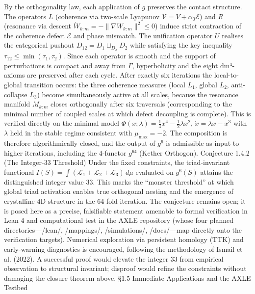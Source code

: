 By the orthogonality law, each application of $  g  $ preserves the contact structure. The operators $  L  $ (coherence via two-scale Lyapunov $  \mathcal{V} = V + \alpha_0 \mathcal{E}  $) and $  R  $ (resonance via descent $  \dot{W}_{k:m} = -\|\nabla W_{k:m}\|^2 \le 0  $) induce strict contraction of the coherence defect $  \mathcal{E}  $ and phase mismatch. The unification operator $  U  $ realises the categorical pushout $  D_{12} = D_1 \sqcup_{D_\lambda} D_2  $ while satisfying the key inequality $  \tau_{12} \le \min(\tau_1, \tau_2)  $. Since each operator is smooth and the support of perturbations is compact and away from $  \Gamma  $, hyperbolicity and the eight dm³-axioms are preserved after each cycle. After exactly six iterations the local-to-global transition occurs: the three coherence measures (local $  L_1  $, global $  L_2  $, anti-collapse $  L_3  $) become simultaneously active at all scales, because the resonance manifold $  M_{k:m}  $ closes orthogonally after six traversals (corresponding to the minimal number of coupled scales at which defect decoupling is complete). This is verified directly on the minimal model $  \Phi(x;\lambda) = \frac14 x^4 - \frac12 \lambda x^2  $, $  \dot{x} = \lambda x - x^3  $ with $  \lambda  $ held in the stable regime consistent with $  \mu_{\max} = -2  $. The composition is therefore algorithmically closed, and the output of $  g^6  $ is admissible as input to higher iterations, including the 4-functor $  g^{64}  $ (Kether Orthogon).
Conjecture 1.4.2 (The Integer-33 Threshold)
Under the fixed constraints, the triad-invariant functional
$   I(S) = \int (\mathcal{L}_1 + \mathcal{L}_2 + \mathcal{L}_3) \, d\mu   $
evaluated on $  g^6(S)  $ attains the distinguished integer value 33. This marks the “monster threshold” at which global triad activation enables true orthogonal nesting and the emergence of crystalline 4D structure in the 64-fold iteration.
The conjecture remains open; it is posed here as a precise, falsifiable statement amenable to formal verification in Lean 4 and computational test in the AXLE repository (whose four planned directories—/lean/, /mappings/, /simulations/, /docs/—map directly onto the verification targets). Numerical exploration via persistent homology (TTK) and early-warning diagnostics is encouraged, following the methodology of Ismail et al. (2022). A successful proof would elevate the integer 33 from empirical observation to structural invariant; disproof would refine the constraints without damaging the closure theorem above.
§1.5 Immediate Applications and the AXLE Testbed
